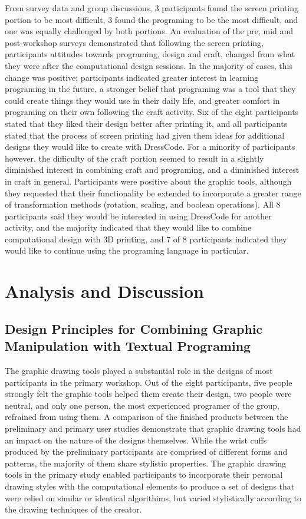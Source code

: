 \documentclass{sigchi}
\begin{document}
From survey data and group discussions, 3 participants found the screen printing portion to be most difficult, 3 found the programing to be the most difficult, and one was equally challenged by both portions. An evaluation of the pre, mid and post-workshop surveys demonstrated that following the screen printing, participants attitudes towards programing, design and craft, changed from what they were after the computational design sessions. In the majority of cases, this change was positive; participants indicated greater interest in learning programing in the future, a stronger belief that programing was a tool that they could create things they would use in their daily life, and greater comfort in programing on their own following the craft activity. Six of the eight participants stated that they liked their design better after printing it, and all participants stated that the process of screen printing had given them ideas for additional designs they would like to create with DressCode. For a minority of participants however, the difficulty of the craft portion seemed to result in a slightly diminished interest in combining craft and programing, and a diminished interest in craft in general. Participants were positive about the graphic tools, although they requested that their functionality be extended to incorporate a greater range of transformation methods (rotation, scaling, and boolean operations). All 8 participants said they would be interested in using DressCode for another activity, and the majority indicated that they would like to combine computational design with 3D printing, and 7 of 8 participants indicated they would like to continue using the programing language in particular.

\section{Analysis and Discussion}

\subsection{Design Principles for Combining Graphic Manipulation with Textual Programing}
The graphic drawing tools played a substantial role in the designs of most participants in the primary workshop. Out of the eight participants, five people strongly felt the graphic tools helped them create their design, two people were neutral, and only one person, the most experienced programer of the group, refrained from using them. A comparison of the finished products between the preliminary and primary user studies demonstrate that graphic drawing tools had an impact on the nature of the designs themselves. While the wrist cuffs produced by the preliminary participants are comprised of different forms and patterns, the majority of them share stylistic properties. The graphic drawing tools in the primary study enabled participants to incorporate their personal drawing styles with the computational elements to produce a set of designs that were relied on similar or identical algorithims, but varied stylistically according to the drawing techniques of the creator. 
\end{document}

